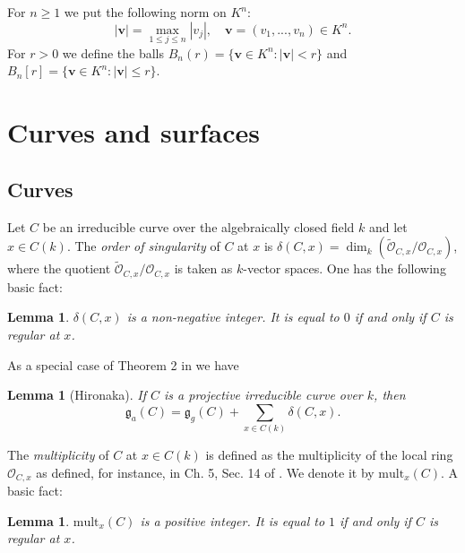 \documentclass[11pt]{amsart}
\newtheorem{lemma}[theorem]{Lemma}
\theoremstyle{remark}
\numberwithin{equation}{section}
\newcommand{\gfrak}{\mathfrak{g}}
\newcommand{\Ocal}{\mathscr{O}}
\newcommand{\vv}{\mathbf{v}}
\newcommand{\mult}{\mathrm{mult}}
\begin{document}
For $n\ge 1$ we put the following norm on $K^n$:
$$
|\vv | = \max_{1\le j\le n}|v_j|, \quad \vv =(v_1,...,v_n)\in K^n.
$$
For $r>0$ we define the balls $B_n(r)=\{\vv \in K^n : |\vv |<r\}$ and  $B_n[r]=\{\vv \in K^n : |\vv |\le r\}$.
 









\section{Curves and surfaces} 

\subsection{Curves} Let $C$ be an irreducible curve over the algebraically closed field $k$ and let $x\in C(k)$. The \emph{order of singularity} of $C$ at $x$ is $\delta(C,x)=\dim_k(\widetilde{\Ocal}_{C,x}/\Ocal_{C,x})$, where the quotient $\widetilde{\Ocal}_{C,x}/\Ocal_{C,x}$ is taken as $k$-vector spaces. One has the following basic fact:
\begin{lemma} $\delta(C,x)$ is a non-negative integer. It is equal to $0$ if and only if $C$ is regular at $x$.
\end{lemma}

As a special case of Theorem 2 in \cite{Hironaka} we have

\begin{lemma}[Hironaka]\label{LemmaHironakaGenus} If $C$ is a projective irreducible curve over $k$, then
$$
\gfrak_a(C)=\gfrak_g(C) + \sum_{x\in C(k)} \delta(C,x).
$$

\end{lemma}

The \emph{multiplicity} of $C$ at  $x\in C(k)$ is defined as the multiplicity of the local ring $\Ocal_{C,x}$ as defined, for instance, in Ch.  5, Sec. 14 of \cite{Matsumura}. We denote it by $\mult_x(C)$. A basic fact:
\begin{lemma} $\mult_x(C)$ is a positive integer. It is equal to $1$ if and only if $C$ is regular at $x$.
\end{lemma}
\end{document}
